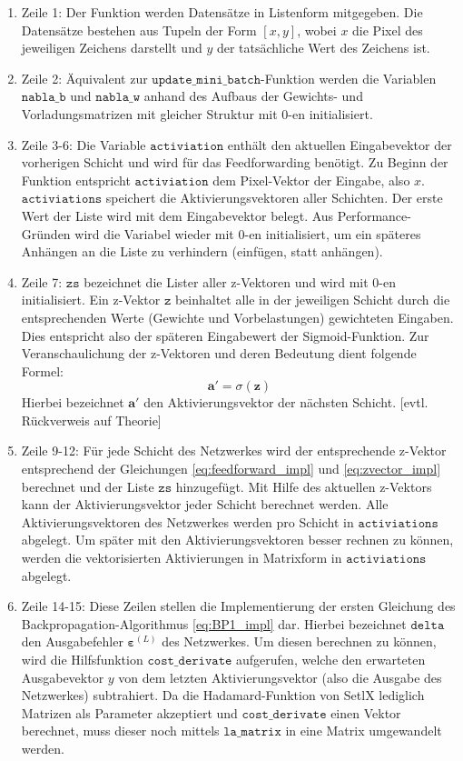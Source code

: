 \begin{enumerate}
\item Zeile 1: Der Funktion werden Datensätze in Listenform mitgegeben. Die Datensätze bestehen aus Tupeln der Form $[x,y]$, wobei $x$ die Pixel des jeweiligen Zeichens darstellt und $y$ der tatsächliche Wert des Zeichens ist.
\item Zeile 2: Äquivalent zur $\mathtt{update\_mini\_batch}$-Funktion werden die Variablen $\mathtt{nabla\_b}$ und $\mathtt{nabla\_w}$ anhand des Aufbaus der Gewichts- und Vorladungsmatrizen mit gleicher Struktur mit 0-en initialisiert.
\item Zeile 3-6: Die Variable $\mathtt{activiation}$ enthält den aktuellen Eingabevektor der vorherigen Schicht und wird für das Feedforwarding benötigt. Zu Beginn der Funktion entspricht $\mathtt{activiation}$ dem Pixel-Vektor der Eingabe, also $x$. $\mathtt{activiations}$ speichert die Aktivierungsvektoren aller Schichten. Der erste Wert der Liste wird mit dem Eingabevektor belegt. Aus Performance-Gründen wird die Variabel wieder mit 0-en initialisiert, um ein späteres Anhängen an die Liste zu verhindern (einfügen, statt anhängen).
\item Zeile 7: $\mathtt{zs}$ bezeichnet die Lister aller z-Vektoren und wird mit 0-en initialisiert. Ein z-Vektor $\mathtt{z}$ beinhaltet alle in der jeweiligen Schicht durch die entsprechenden Werte (Gewichte und Vorbelastungen) gewichteten Eingaben. Dies entspricht also der späteren Eingabewert der Sigmoid-Funktion. Zur Veranschaulichung der z-Vektoren und deren Bedeutung dient folgende Formel:
\begin{equation} \label{eq:zvector_impl}
	\mathbf{a}' = \sigma(\mathbf{z})
\end{equation} 
Hierbei bezeichnet $\mathbf{a}'$ den Aktivierungsvektor der nächsten Schicht. [evtl. Rückverweis auf Theorie]
\item Zeile 9-12: Für jede Schicht des Netzwerkes wird der entsprechende z-Vektor entsprechend der Gleichungen \eqref{eq:feedforward_impl} und \eqref{eq:zvector_impl} berechnet und der Liste $\mathtt{zs}$ hinzugefügt. Mit Hilfe des aktuellen z-Vektors kann der Aktivierungsvektor jeder Schicht berechnet werden. Alle Aktivierungsvektoren des Netzwerkes werden pro Schicht in $\mathtt{activiations}$ abgelegt. Um später mit den Aktivierungsvektoren besser rechnen zu können, werden die vektorisierten Aktivierungen in Matrixform in $\mathtt{activiations}$ abgelegt.
\item Zeile 14-15: Diese Zeilen stellen die Implementierung der ersten Gleichung des Backpropagation-Algorithmus \eqref{eq:BP1_impl} dar. Hierbei bezeichnet $\mathtt{delta}$ den Ausgabefehler $\boldsymbol{\varepsilon}^{(L)}$ des Netzwerkes. Um diesen berechnen zu können, wird die Hilfsfunktion $\mathtt{cost\_derivate}$ aufgerufen, welche den erwarteten Ausgabevektor $y$ von dem letzten Aktivierungsvektor (also die Ausgabe des Netzwerkes) subtrahiert. Da die Hadamard-Funktion von SetlX lediglich Matrizen als Parameter akzeptiert und $\mathtt{cost\_derivate}$ einen Vektor berechnet, muss dieser noch mittels $\mathtt{la\_matrix}$ in eine Matrix umgewandelt werden.

\end{enumerate}
